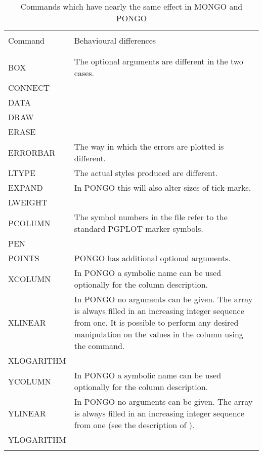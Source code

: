 {\small
\begin{table}
\begin{center}
\begin{tabular}{|l|p{}|}
\hline
& \\
Command    & Behavioural differences \\
& \\
\hline
& \\
BOX        & The optional arguments are different in the two cases. \\
CONNECT    & \\
DATA       & \\
DRAW       & \\
ERASE      & \\
ERRORBAR   & The way in which the errors are plotted is different.
\\
LTYPE      & The actual styles produced are different. \\
EXPAND     & In PONGO this will also alter sizes of tick-marks. \\
LWEIGHT    & \\
PCOLUMN    & The symbol numbers in the file refer to the standard
PGPLOT marker symbols. \\
PEN        & \\
POINTS     & PONGO has additional optional arguments. \\
XCOLUMN    & In PONGO a symbolic name can be used optionally for
the column description. \\
XLINEAR    & In PONGO no arguments can be given. The array is
always filled in an increasing integer sequence from one. It is
possible to perform any desired manipulation on the values in the
column using the \cnam{\iref{CCMATH}} command. \\
XLOGARITHM & \\
YCOLUMN    & In PONGO a symbolic name can be used optionally for
the column description. \\
YLINEAR    & In PONGO no arguments can be given. The array is
always filled in an increasing integer sequence from one (see the description
of \cnam{\iref{XLINEAR}}). \\
YLOGARITHM & \\
& \\ \hline
\end{tabular}
\end{center}
\caption{Commands which have nearly the same effect in MONGO and PONGO}
\label{mongo_same_tab}
\end{table}
}

